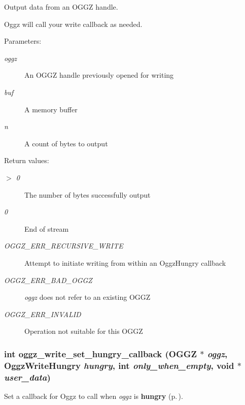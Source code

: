 Output data from an OGGZ handle. 

Oggz will call your write callback as needed.

\begin{Desc}
\item[Parameters:]
\begin{description}
\item[{\em oggz}]An OGGZ handle previously opened for writing \item[{\em buf}]A memory buffer \item[{\em n}]A count of bytes to output \end{description}
\end{Desc}
\begin{Desc}
\item[Return values:]
\begin{description}
\item[{\em $>$ 0}]The number of bytes successfully output \item[{\em 0}]End of stream \item[{\em OGGZ\_\-ERR\_\-RECURSIVE\_\-WRITE}]Attempt to initiate writing from within an Oggz\-Hungry callback \item[{\em OGGZ\_\-ERR\_\-BAD\_\-OGGZ}]{\em oggz\/} does not refer to an existing OGGZ \item[{\em OGGZ\_\-ERR\_\-INVALID}]Operation not suitable for this OGGZ \end{description}
\end{Desc}
\subsubsection{\setlength{\rightskip}{0pt plus 5cm}int oggz\_\-write\_\-set\_\-hungry\_\-callback ({\bf OGGZ} $\ast$ {\em oggz}, {\bf Oggz\-Write\-Hungry} {\em hungry}, int {\em only\_\-when\_\-empty}, void $\ast$ {\em user\_\-data})}\label{group__write__api_a1}


Set a callback for Oggz to call when {\em oggz\/} is {\bf hungry }{\rm (p.\,\pageref{group__hungry})}. 

